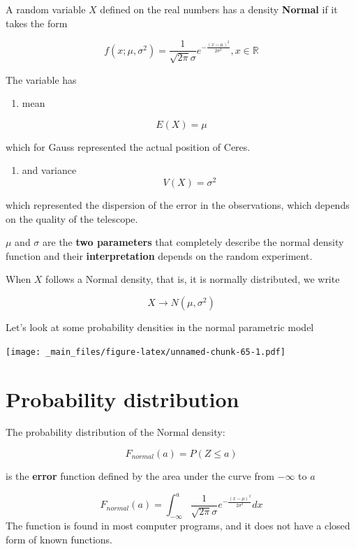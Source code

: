 \documentclass[
]{book}
\providecommand{\tightlist}{%
  \setlength{\itemsep}{0pt}\setlength{\parskip}{0pt}}
\begin{document}
A random variable \(X\) defined on the real numbers has a density \textbf{Normal} if it takes the form

\[f(x; \mu, \sigma^2)=\frac{1}{\sqrt{2\pi}\sigma}e^{-\frac{(x-\mu)^2}{2\sigma^2}}, x \in {\mathbb R}\]

The variable has

\begin{enumerate}
\def\labelenumi{\arabic{enumi})}
\tightlist
\item
  mean
\end{enumerate}

\[E(X) = \mu\]

which for Gauss represented the actual position of Ceres.

\begin{enumerate}
\def\labelenumi{\arabic{enumi})}
\setcounter{enumi}{1}
\tightlist
\item
  and variance
  \[V(X) = \sigma^2\]
\end{enumerate}

which represented the dispersion of the error in the observations, which depends on the quality of the telescope.

\(\mu\) and \(\sigma\) are the \textbf{two parameters} that completely describe the normal density function and their \textbf{interpretation} depends on the random experiment.

When \(X\) follows a Normal density, that is, it is normally distributed, we write

\[X\rightarrow N(\mu,\sigma^2)\]

Let's look at some probability densities in the normal parametric model

\texttt{[image: \_main\_files/figure-latex/unnamed-chunk-65-1.pdf]}

\hypertarget{probability-distribution-2}{%
\section{Probability distribution}\label{probability-distribution-2}}

The probability distribution of the Normal density:

\[F_{normal}(a)=P(Z \leq a)\]

is the \textbf{error} function defined by the area under the curve from \(-\infty\) to \(a\)

\[F_{normal}(a)=\int_{-\infty}^{a}\frac{1}{\sqrt{2\pi}\sigma}e^{-\frac{(x-\mu)^2}{2\sigma^2}} dx\]
The function is found in most computer programs, and it does not have a closed form of known functions.
\end{document}
